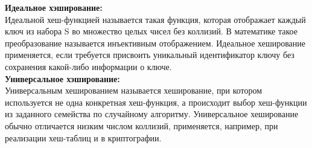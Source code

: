 \documentclass[a4paper,12pt]{article}
\begin{document}
\noindent\textbf{Идеальное хэширование:}\\
Идеальной хеш-функцией  называется такая функция, которая отображает каждый ключ из набора S во множество целых чисел без коллизий. В математике такое преобразование называется инъективным отображением. Идеальное хеширование применяется, если требуется присвоить уникальный идентификатор ключу без сохранения какой-либо информации о ключе. \\

\noindent\textbf{Универсальное хэширование:}\\
Универсальным хешированием называется хеширование, при котором используется не одна конкретная хеш-функция, а происходит выбор хеш-функции из заданного семейства по случайному алгоритму. Универсальное хеширование обычно отличается низким числом коллизий, применяется, например, при реализации хеш-таблиц и в криптографии. \\
\end{document}
